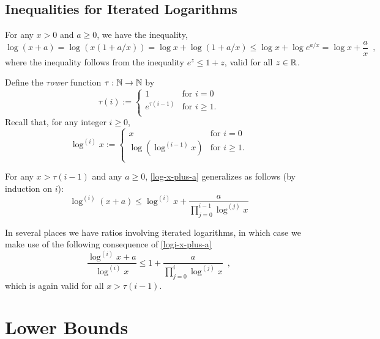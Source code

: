 \documentclass[kpfonts]{patmorin}
\theoremstyle{named}
\begin{document}
\subsection{Inequalities for Iterated Logarithms}

For any $x> 0$ and $a\ge 0$, we have the inequality,
\begin{equation}
    \log (x+a) = \log (x(1+a/x)) = \log x + \log(1+a/x) \le \log x + \log e^{a/x} = \log x + \frac{a}{x} \enspace , \label{log-x-plus-a}
\end{equation}
where the inequality follows from the inequality $e^z \le 1+z$, valid for all $z\in\mathbb{R}$.

Define the \emph{$\tau$ower} function $\tau:\mathbb{N}\to\mathbb{N}$ by
\[
  \tau(i) :=
    \begin{cases}
        1 & \text{for $i=0$} \\
        e^{\tau(i-1)} & \text{for $i\ge 1$.} \\
    \end{cases}
\]
Recall that, for any integer $i\ge 0$,
\[
    \log^{(i)} x :=
      \begin{cases}
          x & \text{for $i=0$} \\
          \log\left(\log^{(i-1)}x\right) & \text{for $i\ge 1$.} \\
      \end{cases}
\]

For any $x > \tau(i-1)$ and any $a\ge 0$, \cref{log-x-plus-a} generalizes as follows (by induction on $i$):
\begin{equation}
    \log^{(i)}(x+a) \le \log^{(i)} x + \frac{a}{\prod_{j=0}^{i-1}\log^{(j)} x} \label{logi-x-plus-a}
\end{equation}

In several places we have ratios involving iterated logarithms, in which case we make use of the following consequence of \cref{logi-x-plus-a}
\begin{equation}
    \frac{\log^{(i)} x+a}{\log^{(i)} x} \le 1 + \frac{a}{\prod_{j=0}^{i}\log^{(j)} x} \enspace, \label{logi-ratio}
\end{equation}
which is again valid for all $x> \tau(i-1)$.

\section{Lower Bounds}
\label{lower-bounds}
\end{document}
